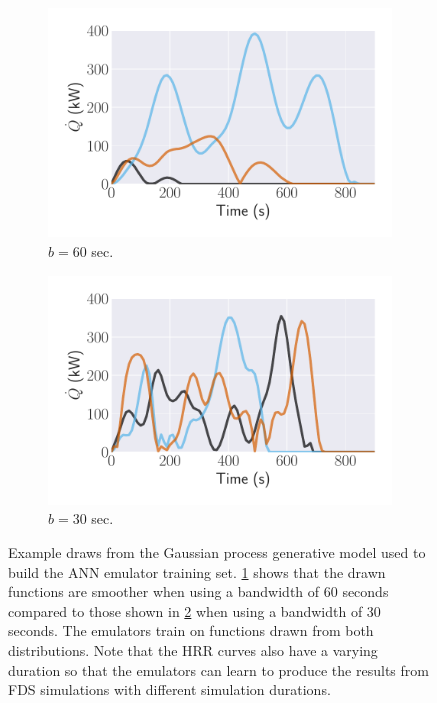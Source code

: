 \documentclass{article}
\begin{document}
\begin{figure}[htbp]
  \centering
  \begin{subfigure}[t]{.45\textwidth}
      \centering
      \includegraphics[width=\textwidth,keepaspectratio]{figures/gp_nn_training_smooth.pdf}
      \caption{ $b=60$ sec.}
      \label{fig:gp_nn_training_smooth}
  \end{subfigure}
  \begin{subfigure}[t]{.45\textwidth}
      \centering
      \includegraphics[width=\textwidth ,keepaspectratio]{figures/gp_nn_training_wiggly.pdf}
      \caption{ $b=30$ sec.}
      \label{fig:gp_nn_training_wiggly}
  \end{subfigure}
  \caption{Example draws from the Gaussian process generative model used to build the ANN emulator training set. \protect\ref{fig:gp_nn_training_smooth} shows that the drawn functions are smoother when using a bandwidth of 60 seconds compared to those shown in \protect\ref{fig:gp_nn_training_wiggly} when using a bandwidth of 30 seconds. The emulators train on functions drawn from both distributions. Note that the HRR curves also have a varying duration so that the emulators can learn to produce the results from FDS simulations with different simulation durations.} 
  \label{fig:gp_nn_training}
\end{figure}
\end{document}
